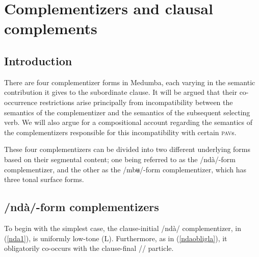 \documentclass[output=paper,colorlinks,citecolor=brown]{langscibook}
\begin{document}
\section{Complementizers and clausal complements}
\subsection{Introduction}\largerpage

There are four complementizer forms in Medumba, each varying in the semantic contribution it gives to the subordinate clause. It will be argued that their co-occurrence restrictions arise principally from incompatibility between the semantics of the complementizer and the semantics of the subsequent selecting verb. We will also argue for a compositional account regarding the semantics of the complementizers responsible for this incompatibility with certain \textsc{pav}s.

\begin{sloppypar}
These four complementizers can be divided into two different underlying forms based on their segmental content; one being referred to as the /nd{à}/-form complementizer, and the other as the /mbʉ/-form complementizer, which has three tonal surface forms.
\end{sloppypar}

\subsection{/nd{à}/-form complementizers}

To begin with the simplest case, the clause-initial /nd{à}/ complementizer, in (\ref{nda1}), is uniformly low-tone (L). Furthermore, as in (\ref{ndaobligla}), it obligatorily co-occurs with the clause-final /\la/ particle.

\ea \label{nda1}
    \begin{xlist}
    \end{xlist}
\z
\end{document}
